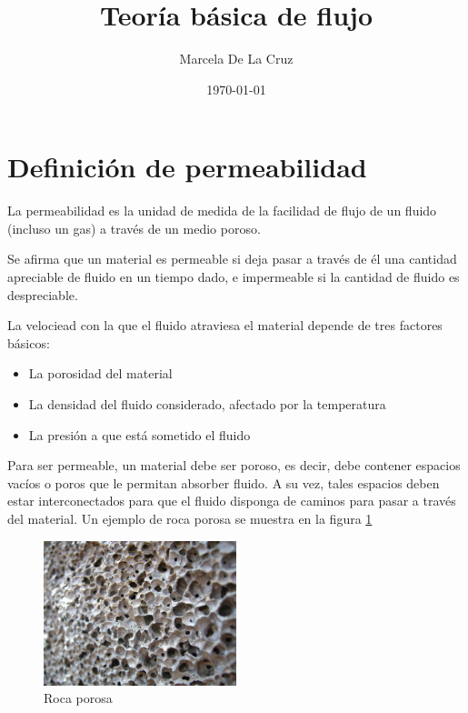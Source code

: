 \documentclass{article}
\author{Marcela De La Cruz}
\date{\today}
\title{\sc Teor\'ia b\'asica de flujo}
\begin{document}
\maketitle 

\thispagestyle{empty}  

\section{Definici\'on de permeabilidad} %

\label{sec:definicion}


La permeabilidad es la unidad de medida de la facilidad de flujo de un fluido (incluso un gas) a trav\'es de un medio poroso.

Se afirma que un material es permeable si deja pasar a trav\'es de \'el una cantidad apreciable de fluido en un tiempo dado, e impermeable si la cantidad de fluido es despreciable.


La velociead con la que el fluido atraviesa el material depende de tres factores b\'asicos:


\begin{itemize}

\item{La porosidad del material}

\item{La densidad del fluido considerado, afectado por la temperatura} 

\item{La presi\'on a que est\'a sometido el fluido}

\end{itemize}


Para ser permeable, un material debe ser poroso, es decir, debe contener espacios vac\'ios o poros que le permitan absorber fluido. A su vez, tales espacios deben estar interconectados para que el fluido disponga de caminos para pasar a trav\'es del material. Un ejemplo de roca porosa se muestra en la figura \ref{fig:poros}


\begin{figure}[h]

\centering

\includegraphics[width=0.5\textwidth]{poros}

\caption{Roca porosa}

\label{fig:poros}

\end{figure}
\end{document}
